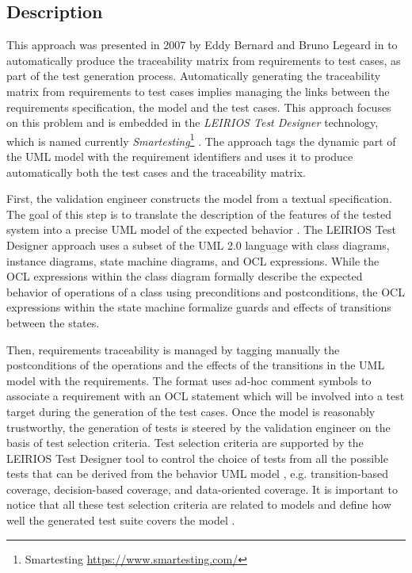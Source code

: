\subsection{Description}
\label{subsec:DE2}
This approach was presented in 2007 by Eddy Bernard and Bruno Legeard in \cite{Paper2} to automatically produce the traceability matrix from requirements to test cases, as part of the test generation process. Automatically generating the traceability matrix from requirements to test cases implies managing the links between the requirements specification, the model and the test cases. This approach focuses on this problem and is embedded in the \textit{LEIRIOS Test Designer} technology, which is named currently \textit{Smartesting}\footnote{Smartesting \url{https://www.smartesting.com/}} \cite{matera}. The approach tags the dynamic part of the UML model with the requirement identifiers and uses it to produce automatically both the test cases and the traceability matrix. 

First, the validation engineer constructs the model from a textual specification. The goal of this step is to translate the description of the features of the tested system into a precise UML model of the expected behavior \cite{LTG}. The LEIRIOS Test Designer approach uses a subset of the UML 2.0 language with class diagrams, instance diagrams, state machine diagrams, and OCL expressions. While the OCL expressions within the class diagram formally describe the expected behavior of operations of a class using preconditions and postconditions, the OCL expressions within the state machine formalize guards and effects of transitions between the states. 

Then, requirements traceability is managed by tagging manually the postconditions of the operations and the effects of the transitions in the UML model with the requirements. The format uses ad-hoc comment symbols to associate a requirement with an OCL statement which will be involved into a test target during the generation of the test cases. Once the model is reasonably trustworthy, the generation of tests is steered by the validation engineer on the basis of test selection criteria. Test selection criteria are supported by the LEIRIOS Test Designer tool to control the choice of tests from all the possible tests that can be derived from the behavior UML model \cite{LTG}, e.g. transition-based coverage, decision-based coverage, and data-oriented coverage. It is important to notice that all these test selection criteria are related to models and define how well the generated test suite covers the model \cite{LTG}. 


